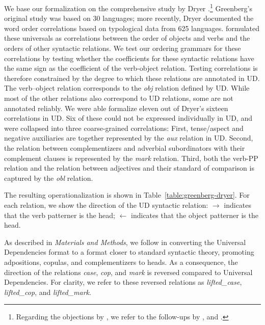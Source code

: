 \documentclass[10pt,twoside,lineno]{article}
\begin{document}
We base our formalization on the comprehensive study by Dryer \cite{dryer1992greenbergian}.\footnote{Regarding the objections by \citet{dunn2011evolved}, we refer to the follow-ups by \citet{levy2011computational}, and \citet{croft2011greenbergian}.}
Greenberg's original study was based on 30 languages; more recently, Dryer \cite{dryer1992greenbergian} documented the word order correlations based on typological data from 625 languages.
\citet{dryer1992greenbergian} formulated these universals as correlations between the order of objects and verbs and the orders of other syntactic relations.
We test our ordering grammars for these correlations by testing whether the coefficients for these syntactic relations have the same sign as the coefficient of the verb-object relation.
Testing correlations is therefore constrained by the degree to which these relations are annotated in UD.
The verb--object relation corresponds to the  \emph{obj} relation defined by UD.
While most of the other relations also correspond to UD relations, some are not annotated reliably.
We were able formalize eleven out of Dryer's sixteen correlations in UD.
Six of these could not be expressed individually in UD, and were collapsed into three coarse-grained correlations:
First, tense/aspect and negative auxiliaries are together represented by the \emph{aux} relation in UD.
Second, the relation between complementizers and adverbial subordinators with their complement clauses is represented by the \emph{mark} relation.
Third, both the verb-PP relation and the relation between adjectives and their standard of comparison is captured by the \emph{obl} relation.

The resulting operationalization is shown in Table~\ref{table:greenberg-dryer}.
For each relation, we show the direction of the UD syntactic relation: $\rightarrow$ indicates that the verb patterner is the head; $\leftarrow$ indicates that the object patterner is the head.

As described in \emph{Materials and Methods}, we follow \citet{futrell2015largescale} in converting the Universal Dependencies format to a format closer to standard syntactic theory, promoting adpositions, copulas, and complementizers to heads.
As a consequence, the direction of the relations \emph{case}, \emph{cop}, and \emph{mark} is reversed compared to Universal Dependencies.
For clarity, we refer to these reversed relations as \emph{lifted\_case}, \emph{lifted\_cop}, and \emph{lifted\_mark}.
\end{document}
